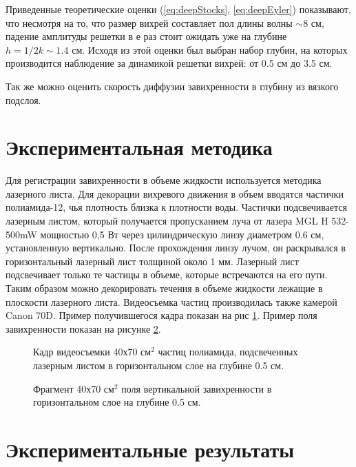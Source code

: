 Приведенные теоретические оценки (\ref{eq:deepStocks}, \ref{eq:deepEyler}) показывают, что несмотря на то, что размер вихрей составляет пол длины волны $\sim 8$ см, падение амплитуды решетки в е раз стоит ожидать уже на глубине $h = 1/2k \sim 1.4$ см. Исходя из этой оценки был выбран набор глубин, на которых производится наблюдение за динамикой решетки вихрей: от 0.5 см до 3.5 см.

Так же можно оценить скорость диффузии завихренности в глубину из вязкого подслоя. 

\section{Экспериментальная методика} \label{sect6_2}
Для регистрации завихренности в объеме жидкости используется методика лазерного листа. Для декорации вихревого движения в объем вводятся частички полиамида-12, чья плотность близка к плотности воды. Частички подсвечивается лазерным листом, который получается пропусканием луча от лазера MGL H 532-500mW мощностью 0,5 Вт  через цилиндрическую линзу диаметром 0.6 см, установленную вертикально. После прохождения линзу лучом, он раскрывался в горизонтальный лазерный лист толщиной около 1 мм. Лазерный лист подсвечивает только те частицы в объеме, которые встречаются на его пути. Таким образом можно декорировать течения в объеме жидкости лежащие в плоскости лазерного листа. Видеосъемка частиц производилась также камерой Canon 70D. Пример получившегося кадра показан на рис \ref{img:track0p5cm}. Пример поля завихренности показан на рисунке \ref{img:vort0p5cm}.
\begin{figure}[ht]
  \caption{Кадр видеосъемки 40х70 см$^2$ частиц полиамида, подсвеченных лазерным листом в горизонтальном слое на глубине 0.5 см.}
  \label{img:track0p5cm}  
\end{figure}

\begin{figure}[ht]
  \caption{Фрагмент 40х70 см$^2$ поля вертикальной завихренности в горизонтальном слое на глубине 0.5 см.}
  \label{img:vort0p5cm}  
\end{figure}


\section{Экспериментальные результаты} \label{sect6_3}

